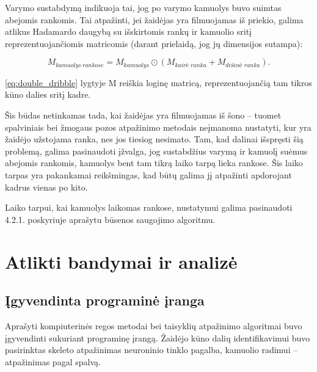 \documentclass{VUMIFPSbakalaurinis}
\begin{document}
Varymo sustabdymą indikuoja tai, jog po varymo kamuolys buvo suimtas abejomis rankomis. Tai atpažinti, jei žaidėjas yra filmuojamas iš priekio, galima atlikus Hadamardo daugybą su išskirtomis rankų ir kamuolio sritį reprezentuojančiomis matricomis (darant prielaidą, jog jų dimensijos sutampa):

\begin{equation}\label{eq:double_dribble}
	M_{kamuolys\ rankose} = M_{kamuolys} \odot (M_{\textit{kairė\ ranka}} + M_{\textit{dešinė\ ranka}}).
\end{equation}

\ref{eq:double_dribble} lygtyje M reiškia loginę matricą, reprezentuojančią tam tikros kūno dalies sritį kadre. 

Šis būdas netinkamas tada, kai žaidėjas yra filmuojamas iš šono – tuomet spalviniais bei žmogaus pozos atpažinimo metodais neįmanoma nustatyti, kur yra žaidėjo užstojama ranka, nes jos tiesiog nesimato. Tam, kad dalinai išspręsti šią problemą, galima pasinaudoti įžvalga, jog sustabdžius varymą ir kamuolį suėmus abejomis rankomis, kamuolys bent tam tikrą laiko tarpą lieka rankose. Šis laiko tarpas yra pakankamai reikšmingas, kad būtų galima jį atpažinti apdorojant kadrus vienas po kito. 

Laiko tarpui, kai kamuolys laikomas rankose, nustatymui galima pasinaudoti 4.2.1. poskyriuje aprašytu būsenos saugojimo algoritmu. 

\section{Atlikti bandymai ir analizė}

\subsection{Įgyvendinta programinė įranga}

Aprašyti kompiuterinės regos metodai bei taisyklių atpažinimo algoritmai buvo įgyvendinti sukuriant programinę įrangą. Žaidėjo kūno dalių identifikavimui buvo pasirinktas skeleto atpažinimas neuroninio tinklo pagalba, kamuolio radimui – atpažinimas pagal spalvą. 
\end{document}
